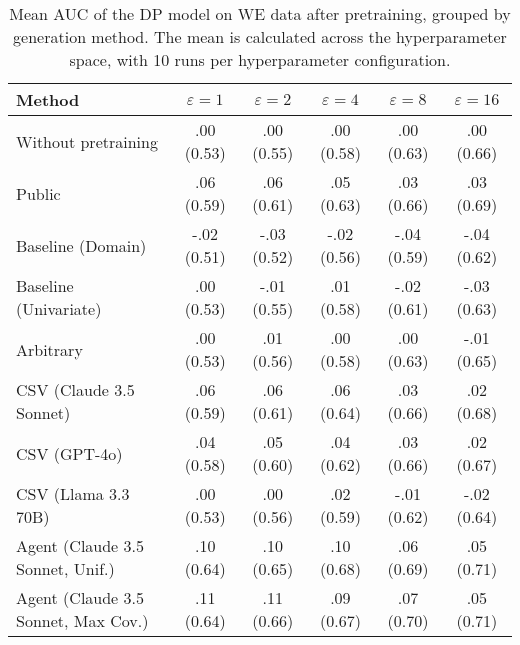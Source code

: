 \begin{table}[h!]
    \centering
    \caption{Mean AUC of the DP model on WE data after pretraining, grouped by generation method. The mean is calculated across the hyperparameter space, with 10 runs per hyperparameter configuration.}
    \label{tab:epsilon_comparison}
    \begin{tabular}{lccccc}
    \toprule
    Method & $\varepsilon=1$ & $\varepsilon=2$ & $\varepsilon=4$ & $\varepsilon=8$ & $\varepsilon=16$ \\
    \midrule
    Without pretraining & .00 {\small (0.53)} & .00 {\small (0.55)} & .00 {\small (0.58)} & .00 {\small (0.63)} & .00 {\small (0.66)} \\
    \arrayrulecolor{black!50!}\midrule
    Public & .06 {\small (0.59)} & .06 {\small (0.61)} & .05 {\small (0.63)} & .03 {\small (0.66)} & \cellcolor{bronze!30}.03 {\small (0.69)} \\
    \arrayrulecolor{black!50!}\midrule
    Baseline (Domain) & -.02 {\small (0.51)} & -.03 {\small (0.52)} & -.02 {\small (0.56)} & -.04 {\small (0.59)} & -.04 {\small (0.62)} \\
    Baseline (Univariate) & .00 {\small (0.53)} & -.01 {\small (0.55)} & .01 {\small (0.58)} & -.02 {\small (0.61)} & -.03 {\small (0.63)} \\
    \arrayrulecolor{black!50!}\midrule
    Arbitrary & .00 {\small (0.53)} & .01 {\small (0.56)} & .00 {\small (0.58)} & .00 {\small (0.63)} & -.01 {\small (0.65)} \\
    \arrayrulecolor{black!50!}\midrule
    CSV (Claude 3.5 Sonnet) & .06 {\small (0.59)} & .06 {\small (0.61)} & .06 {\small (0.64)} & \cellcolor{bronze!30}.03 {\small (0.66)} & .02 {\small (0.68)} \\
    CSV (GPT-4o) & .04 {\small (0.58)} & .05 {\small (0.60)} & .04 {\small (0.62)} & .03 {\small (0.66)} & .02 {\small (0.67)} \\
    CSV (Llama 3.3 70B) & .00 {\small (0.53)} & .00 {\small (0.56)} & .02 {\small (0.59)} & -.01 {\small (0.62)} & -.02 {\small (0.64)} \\
    \arrayrulecolor{black!50!}\midrule
    Agent (Claude 3.5 Sonnet, Unif.) & \cellcolor{silver!30}.10 {\small (0.64)} & \cellcolor{silver!30}.10 {\small (0.65)} & \cellcolor{gold!30}.10 {\small (0.68)} & \cellcolor{silver!30}.06 {\small (0.69)} & \cellcolor{silver!30}.05 {\small (0.71)} \\
    Agent (Claude 3.5 Sonnet, Max Cov.) & \cellcolor{gold!30}.11 {\small (0.64)} & \cellcolor{gold!30}.11 {\small (0.66)} & \cellcolor{silver!30}.09 {\small (0.67)} & \cellcolor{gold!30}.07 {\small (0.70)} & \cellcolor{gold!30}.05 {\small (0.71)} \\

\end{tabular}
\end{table}
